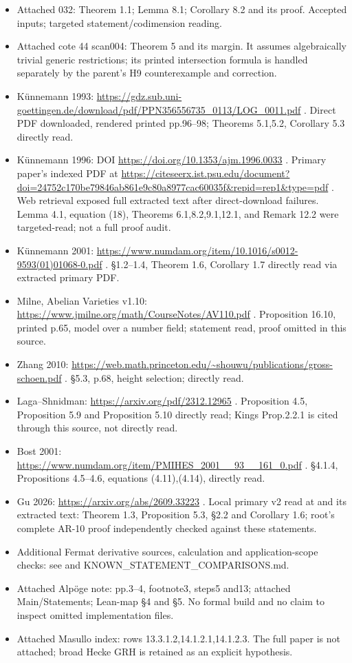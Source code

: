 \documentclass[11pt,a4paper]{article}
\providecommand{\tightlist}{\setlength{\itemsep}{0pt}\setlength{\parskip}{0pt}}
\begin{document}
\begin{itemize}
\tightlist
\item
  Attached 032: Theorem 1.1; Lemma 8.1; Corollary 8.2 and its proof.
  Accepted inputs; targeted statement/codimension reading.
\item
  Attached cote 44 scan004: Theorem 5 and its margin. It assumes
  algebraically trivial generic restrictions; its printed intersection
  formula is handled separately by the parent's H9 counterexample and
  correction.
\item
  Künnemann 1993:
  \url{https://gdz.sub.uni-goettingen.de/download/pdf/PPN356556735_0113/LOG_0011.pdf}
  . Direct PDF downloaded, rendered printed pp.96--98; Theorems 5.1,5.2,
  Corollary 5.3 directly read.
\item
  Künnemann 1996: DOI \url{https://doi.org/10.1353/ajm.1996.0033} . Primary
  paper's indexed PDF at
  \url{https://citeseerx.ist.psu.edu/document?doi=24752c170be79846ab861e9c80a8977cac60035f&repid=rep1&type=pdf}
  . Web retrieval exposed full extracted text after direct-download
  failures. Lemma 4.1, equation (18), Theorems 6.1,8.2,9.1,12.1, and
  Remark 12.2 were targeted-read; not a full proof audit.
\item
  Künnemann 2001:
  \url{https://www.numdam.org/item/10.1016/s0012-9593(01)01068-0.pdf} .
  §1.2--1.4, Theorem 1.6, Corollary 1.7 directly read via extracted
  primary PDF.
\item
  Milne, Abelian Varieties v1.10:
  \url{https://www.jmilne.org/math/CourseNotes/AV110.pdf} . Proposition 16.10,
  printed p.65, model over a number field; statement read, proof omitted
  in this source.
\item
  Zhang 2010:
  \url{https://web.math.princeton.edu/~shouwu/publications/gross-schoen.pdf}
  . §5.3, p.68, height selection; directly read.
\item
  Laga--Shnidman: \url{https://arxiv.org/pdf/2312.12965} . Proposition 4.5,
  Proposition 5.9 and Proposition 5.10 directly read; Kings Prop.2.2.1
  is cited through this source, not directly read.
\item
  Bost 2001:
  \url{https://www.numdam.org/item/PMIHES_2001__93__161_0.pdf} . §4.1.4,
  Propositions 4.5--4.6, equations (4.11),(4.14), directly read.
\item
  Gu 2026: \url{https://arxiv.org/abs/2609.33223} . Local primary v2 read at
   and its extracted text: Theorem 1.3, Proposition 5.3, §2.2
  and Corollary 1.6; root's complete AR-10 proof independently checked
  against these statements.
\item
  Additional Fermat derivative sources, calculation and
  application-scope checks: see  and
  KNOWN\_STATEMENT\_COMPARISONS.md.
\item
  Attached Alpöge note: pp.3--4, footnote3, steps5 and13; attached
  Main/Statements; Lean-map §4 and §5. No formal build and no claim to
  inspect omitted implementation files.
\item
  Attached Masullo index: rows 13.3.1.2,14.1.2.1,14.1.2.3. The full
  paper is not attached; broad Hecke GRH is retained as an explicit
  hypothesis.
\end{itemize}
\end{document}
